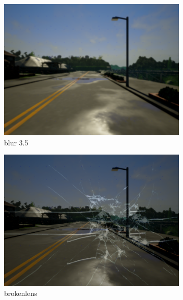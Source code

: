 \documentclass[14pt]{extarticle}
\begin{document}
\begin{figure}
\begin{subfigure}[b]{0.3\textwidth}
			 \includegraphics[scale=0.1]{./foto_sporcature/blur.png}
	         \caption{blur 3.5}
	         \label{fig:blur}
	     \end{subfigure}
	     \hfill
	     \begin{subfigure}[b]{0.3\textwidth}
	         \centering
			 \includegraphics[scale=0.1]{./foto_sporcature/brokenlens.png}
	         \caption{brokenlens}
	         \label{fig:brokenlens}
	     \end{subfigure}
	     \hfill
	     \begin{subfigure}[b]{0.3\textwidth}
	         \centering

\end{subfigure}
\end{figure}
\end{document}

